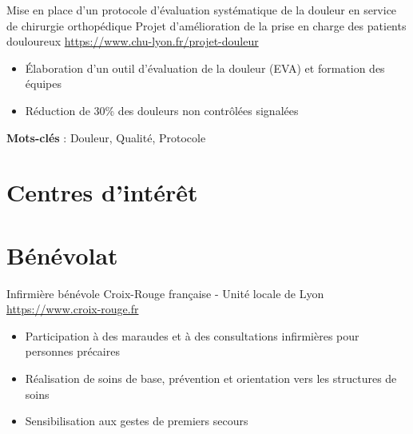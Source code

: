 \documentclass[a4paper, serif, 10pt]{moderncv}
\begin{document}
        {Mise en place d'un protocole d'évaluation systématique de la douleur en service de chirurgie orthopédique}
        {Projet d'amélioration de la prise en charge des patients douloureux}
        {\url{https://www.chu-lyon.fr/projet-douleur}}
        {}
        {\begin{itemize}
\item Élaboration d'un outil d'évaluation de la douleur (EVA) et formation des équipes
\item Réduction de 30\% des douleurs non contrôlées signalées
\end{itemize}
\textbf{Mots-clés} : Douleur, Qualité, Protocole}
\section{Centres d'intérêt}

\section{Bénévolat}

        {Infirmière bénévole}
        {Croix-Rouge française - Unité locale de Lyon}
        {\url{https://www.croix-rouge.fr}}
        {}
        {\begin{itemize}
\item Participation à des maraudes et à des consultations infirmières pour personnes précaires
\item Réalisation de soins de base, prévention et orientation vers les structures de soins
\item Sensibilisation aux gestes de premiers secours
\end{itemize}}
    
\end{document}
